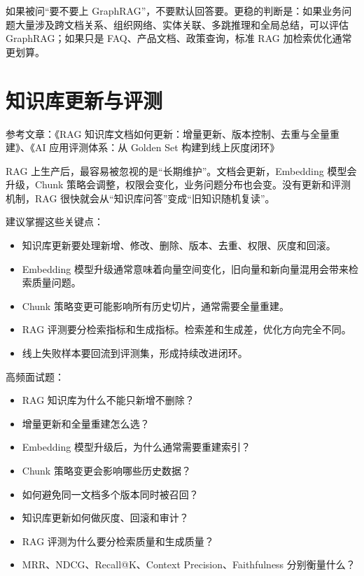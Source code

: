 \documentclass[10pt,a4paper]{ctexart}
\begin{document}
如果被问“要不要上 GraphRAG”，不要默认回答要。更稳的判断是：如果业务问题大量涉及跨文档关系、组织网络、实体关联、多跳推理和全局总结，可以评估 GraphRAG；如果只是 FAQ、产品文档、政策查询，标准 RAG 加检索优化通常更划算。



\section{知识库更新与评测}


参考文章：《RAG 知识库文档如何更新：增量更新、版本控制、去重与全量重建》、《AI 应用评测体系：从 Golden Set 构建到线上灰度闭环》



RAG 上生产后，最容易被忽视的是“长期维护”。文档会更新，Embedding 模型会升级，Chunk 策略会调整，权限会变化，业务问题分布也会变。没有更新和评测机制，RAG 很快就会从“知识库问答”变成“旧知识随机复读”。



建议掌握这些关键点：


\begin{itemize}[itemsep=2pt, topsep=4pt]
  \item 知识库更新要处理新增、修改、删除、版本、去重、权限、灰度和回滚。
  \item Embedding 模型升级通常意味着向量空间变化，旧向量和新向量混用会带来检索质量问题。
  \item Chunk 策略变更可能影响所有历史切片，通常需要全量重建。
  \item RAG 评测要分检索指标和生成指标。检索差和生成差，优化方向完全不同。
  \item 线上失败样本要回流到评测集，形成持续改进闭环。
\end{itemize}


高频面试题：


\begin{itemize}[itemsep=2pt, topsep=4pt]
  \item RAG 知识库为什么不能只新增不删除？
  \item 增量更新和全量重建怎么选？
  \item Embedding 模型升级后，为什么通常需要重建索引？
  \item Chunk 策略变更会影响哪些历史数据？
  \item 如何避免同一文档多个版本同时被召回？
  \item 知识库更新如何做灰度、回滚和审计？
  \item RAG 评测为什么要分检索质量和生成质量？
  \item MRR、NDCG、Recall@K、Context Precision、Faithfulness 分别衡量什么？
\end{itemize}
\end{document}
